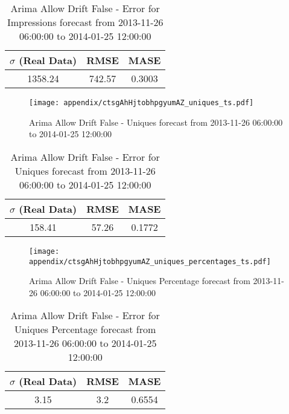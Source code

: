 \begin{table}[H]
\centering
\footnotesize
\begin{tabular}{ccc}
$\sigma$ (Real Data) & RMSE & MASE   \\ \hline
1358.24 & 742.57 & 0.3003 \\
\end{tabular}

\vspace{0.5cm}

\caption[]{
Arima Allow Drift False - Error for Impressions forecast from 2013-11-26 06:00:00 to 2014-01-25 12:00:00}
\end{table}

\begin{figure}[H] \begin{center} \leavevmode
\texttt{[image: appendix/ctsgAhHjtobhpgyumAZ\_uniques\_ts.pdf]} \caption[]{
Arima Allow Drift False - Uniques forecast from 2013-11-26 06:00:00 to 2014-01-25 12:00:00} \label{fig:appendix/ctsgAhHjtobhpgyumAZ_uniques_ts.pdf} \end{center}
\end{figure}

\begin{table}[H]
\centering
\footnotesize
\begin{tabular}{ccc}
$\sigma$ (Real Data) & RMSE & MASE   \\ \hline
158.41 & 57.26 & 0.1772 \\
\end{tabular}

\vspace{0.5cm}

\caption[]{
Arima Allow Drift False - Error for Uniques forecast from 2013-11-26 06:00:00 to 2014-01-25 12:00:00}
\end{table}

\begin{figure}[H] \begin{center} \leavevmode
\texttt{[image: appendix/ctsgAhHjtobhpgyumAZ\_uniques\_percentages\_ts.pdf]} \caption[]{
Arima Allow Drift False - Uniques Percentage forecast from 2013-11-26 06:00:00 to 2014-01-25 12:00:00} \label{fig:appendix/ctsgAhHjtobhpgyumAZ_uniques_percentages_ts.pdf} \end{center}
\end{figure}

\begin{table}[H]
\centering
\footnotesize
\begin{tabular}{ccc}
$\sigma$ (Real Data) & RMSE & MASE   \\ \hline
3.15 & 3.2 & 0.6554 \\
\end{tabular}

\vspace{0.5cm}

\caption[]{
Arima Allow Drift False - Error for Uniques Percentage forecast from 2013-11-26 06:00:00 to 2014-01-25 12:00:00}
\end{table}

